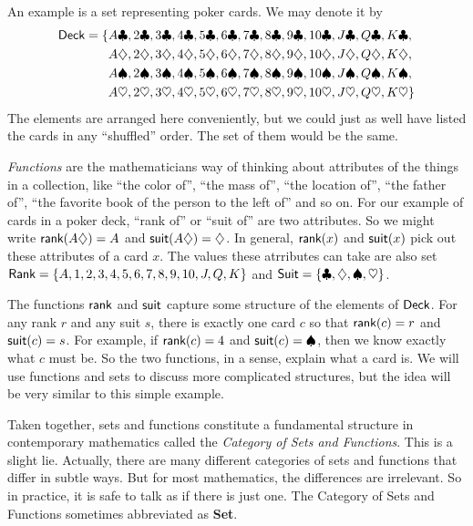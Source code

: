 An example is a set representing poker cards. We may denote it by
\begin{align*}{\mathord{\textsf{Deck}}}=\{&A\clubsuit,2\clubsuit,3\clubsuit,4\clubsuit,5\clubsuit,6\clubsuit,7\clubsuit,8\clubsuit,9\clubsuit,10\clubsuit, J\clubsuit,Q\clubsuit,K\clubsuit,\\
&A\diamondsuit,2\diamondsuit,3\diamondsuit,4\diamondsuit,5\diamondsuit,6\diamondsuit,7\diamondsuit,8\diamondsuit,9\diamondsuit,10\diamondsuit, J\diamondsuit,Q\diamondsuit,K\diamondsuit,\\
&A\spadesuit,2\spadesuit,3\spadesuit,4\spadesuit,5\spadesuit,6\spadesuit,7\spadesuit,8\spadesuit,9\spadesuit,10\spadesuit, J\spadesuit,Q\spadesuit,K\spadesuit,\\
&A\heartsuit,2\heartsuit,3\heartsuit,4\heartsuit,5\heartsuit,6\heartsuit,7\heartsuit,8\heartsuit,9\heartsuit,10\heartsuit, J\heartsuit,Q\heartsuit,K\heartsuit\}
\end{align*}
The elements are arranged here conveniently, but we could just as well have listed the cards in any ``shuffled'' order. The set of them would be the same.

\emph{Functions} are the mathematicians way of thinking about attributes of the things in a collection, like ``the color of'', ``the mass of'', ``the location of'', ``the father of'', ``the favorite book of the person to the left of'' and so on.
For our example of cards in a poker deck, ``rank of'' or ``suit of'' are two attributes. So we might write $\mathord{\textsf{rank}}(A\diamondsuit) = A$ and $\mathord{\textsf{suit}}(A\diamondsuit)=\diamondsuit$.
In general, $\mathord{\textsf{rank}}(x)$ and $\mathord{\textsf{suit}}(x)$ pick out these attributes of a card $x$.
The values these atrributes can take are also set ${\mathord{\textsf{Rank}}} = \{A,1,2,3,4,5,6,7,8,9,10,J,Q,K\}$ 
and ${\mathord{\textsf{Suit}}} = \{\clubsuit, \diamondsuit,\spadesuit,\heartsuit\}$.

The functions $\mathord{\textsf{rank}}$ and $\mathord{\textsf{suit}}$ capture some structure of the elements of ${\mathord{\textsf{Deck}}}$. For any rank $r$ and any suit $s$, there is exactly one card $c$ so that $\mathord{\textsf{rank}}(c)=r$ and $\mathord{\textsf{suit}}(c)=s$. 
For example, if $\mathord{\textsf{rank}}(c)=4$ and $\mathord{\textsf{suit}}(c)=\spadesuit$, then we know exactly what $c$ must be. So the two functions, in a sense, explain what a card is. We will use functions and sets to discuss more complicated structures, but the idea will be very similar to this simple example.

Taken together, sets and functions constitute a fundamental structure in contemporary mathematics called the \emph{Category of Sets and Functions}. 
This is a slight lie.
Actually, there are many different categories of sets and functions that differ in subtle ways. 
But for most mathematics, the differences are irrelevant.
So in practice, it is safe to talk as if there is just one.
The Category of Sets and Functions sometimes abbreviated as \textbf{Set}.

